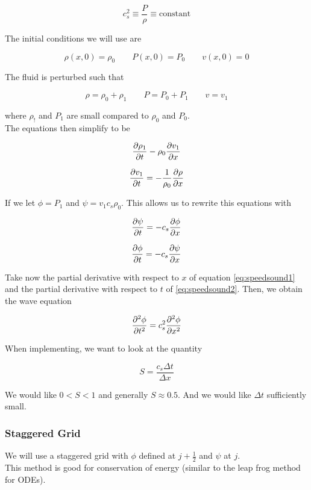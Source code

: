 \documentclass[]{article}
\begin{document}
\[c_s^2 \equiv \frac{P}{\rho} \equiv \text{constant}\]

The initial conditions we will use are 

\[\rho(x, 0) = \rho_0 \qquad P(x, 0) = P_0 \qquad v(x, 0) = 0\]

The fluid is perturbed such that 

\[\rho = \rho_0 + \rho_1 \qquad P= P_0 + P_1 \qquad v = v_1\]

where $\rho_!$ and $P_1$ are small compared to $\rho_0$ and $P_0$.\\

The equations then simplify to be

\[\pdv{\rho_1}{t} - \rho_0 \pdv{v_1}{x}\]

\[\pdv{v_1}{t} = -\frac{1}{\rho_0} \pdv{\rho}{x}\]

If we let $\phi = P_1$ and $\psi = v_1c_s\rho_0$. This allows us to rewrite this equations with

\begin{equation} \label{eq:speedsound1}
	\pdv{\psi}{t} = -c_s\pdv{\phi}{x}
\end{equation}

\begin{equation} \label{eq:speedsound2}
	\pdv{\phi}{t} = -c_s\pdv{\psi}{x}
\end{equation}

Take now the partial derivative with respect to $x$ of equation \ref{eq:speedsound1} and the partial derivative with respect to $t$ of \ref{eq:speedsound2}. Then, we obtain the wave equation

\[\pdv[2]{\phi}{t} = c_s^2\pdv[2]{\phi}{x}\]


When implementing, we want to look at the quantity

\[S = \frac{c_s \Delta t}{\Delta x}\]

We would like $0<S<1$ and generally $S \approx 0.5$. And we would like $\Delta t$ sufficiently small.\\


\subsubsection{Staggered Grid} \bigbreak

We will use a staggered grid with $\phi$ defined at $j+\frac{1}{2}$ and $\psi$ at $j$.\\


This method is good for conservation of energy (similar to the leap frog method for ODEs).\\
\end{document}
